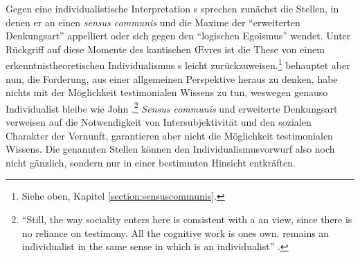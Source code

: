 Gegen eine individualistische Interpretation s sprechen
zunächst die Stellen, in denen er an einen \emph{sensus communis} und die Maxime
der \enquote{erweiterten Denkungsart} appelliert oder sich gegen den
\enquote{logischen Egoismus} wendet. Unter Rückgriff auf diese Momente des
kantischen {\OE}vres ist die These von einem
erkenntnistheoretischen Individualismus s
leicht zurückzuweisen.\footnote{Siehe oben, Kapitel
\ref{section:sensuscommunis}.}
 behauptet aber nun,
die Forderung, aus einer allgemeinen Perspektive heraus zu denken, habe nichts
mit der Möglichkeit testimonialen Wissens zu tun, weswegen 
genauso Individualist bleibe wie John
.\footnote{\enquote{Still, the way sociality enters here is
consistent with a an view, since there is no reliance on
testimony.
All the cognitive work is ones own.
 remains an individualist in the same sense in which
 is an individualist}
\parencite[][47]{Schmitt:JustificationSocialityandAutonomy1987}.} \emph{Sensus
communis} und erweiterte Denkungsart verweisen auf die Notwendigkeit von
Intersubjektivität und den sozialen Charakter der Vernunft, garantieren aber
nicht die Möglichkeit testimonialen Wissens. Die genannten
Stellen können den Individualismusvorwurf also noch nicht gänzlich, sondern nur
in einer bestimmten Hinsicht entkräften.

